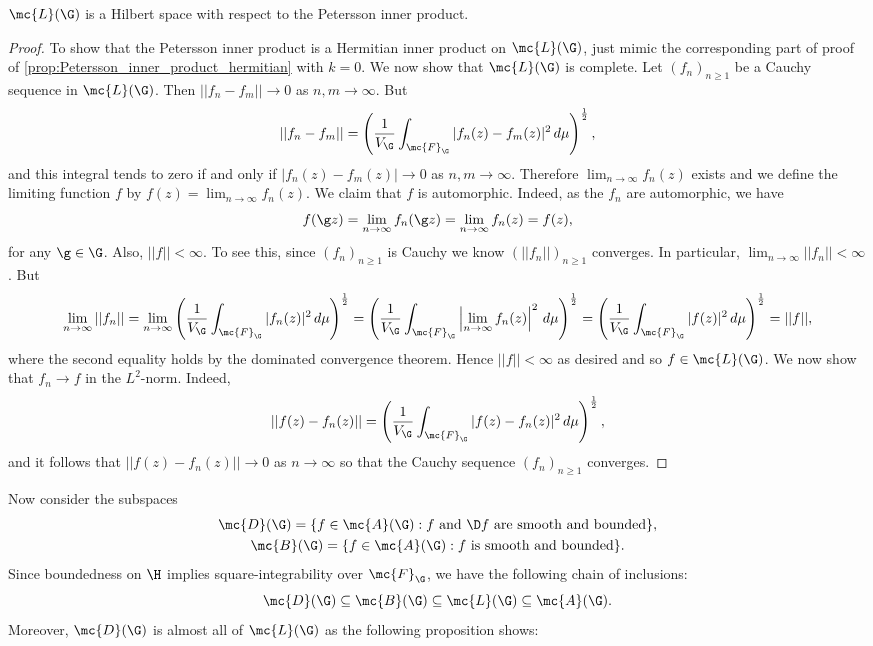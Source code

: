     \begin{theorem}
      $\mc{L}(\G)$ is a Hilbert space with respect to the Petersson inner product.
    \end{theorem}
    \begin{proof}
      To show that the Petersson inner product is a Hermitian inner product on $\mc{L}(\G)$, just mimic the corresponding part of proof of \cref{prop:Petersson_inner_product_hermitian} with $k = 0$. We now show that $\mc{L}(\G)$ is complete. Let $(f_{n})_{n \ge 1}$ be a Cauchy sequence in $\mc{L}(\G)$. Then $||f_{n}-f_{m}|| \to 0$ as $n,m \to \infty$. But
      \[
        ||f_{n}-f_{m}|| = \left(\frac{1}{V_{\G}}\int_{\mc{F}_{\G}}|f_{n}(z)-f_{m}(z)|^{2}\,d\mu\right)^{\frac{1}{2}},
      \]
      and this integral tends to zero if and only if $|f_{n}(z)-f_{m}(z)| \to 0$ as $n,m \to \infty$. Therefore $\lim_{n \to \infty}f_{n}(z)$ exists and we define the limiting function $f$ by $f(z) = \lim_{n \to \infty}f_{n}(z)$. We claim that $f$ is automorphic. Indeed, as the $f_{n}$ are automorphic, we have
      \[
        f(\g z) = \lim_{n \to \infty}f_{n}(\g z) = \lim_{n \to \infty}f_{n}(z) = f(z),
      \]
      for any $\g \in \G$. Also, $||f|| < \infty$. To see this, since $(f_{n})_{n \ge 1}$ is Cauchy we know $(||f_{n}||)_{n \ge 1}$ converges. In particular, $\lim_{n \to \infty}||f_{n}|| < \infty$. But
      \[
        \lim_{n \to \infty}||f_{n}|| = \lim_{n \to \infty}\left(\frac{1}{V_{\G}}\int_{\mc{F}_{\G}}|f_{n}(z)|^{2}\,d\mu\right)^{\frac{1}{2}} = \left(\frac{1}{V_{\G}}\int_{\mc{F}_{\G}}\left|\lim_{n \to \infty}f_{n}(z)\right|^{2}\,d\mu\right)^{\frac{1}{2}} = \left(\frac{1}{V_{\G}}\int_{\mc{F}_{\G}}|f(z)|^{2}\,d\mu\right)^{\frac{1}{2}} = ||f||,
      \]
      where the second equality holds by the dominated convergence theorem. Hence $||f|| < \infty$ as desired and so $f \in \mc{L}(\G)$. We now show that $f_{n} \to f$ in the $L^{2}$-norm. Indeed,
      \[
        ||f(z)-f_{n}(z)|| = \left(\frac{1}{V_{\G}}\int_{\mc{F}_{\G}}|f(z)-f_{n}(z)|^{2}\,d\mu\right)^{\frac{1}{2}},
      \]
      and it follows that $||f(z)-f_{n}(z)|| \to 0$ as $n \to \infty$ so that the Cauchy sequence $(f_{n})_{n \ge 1}$ converges.
    \end{proof}

    Now consider the subspaces
    \begin{gather*}
      \mc{D}(\G) = \{f \in \mc{A}(\G):\text{$f$ and $\D f$ are smooth and bounded}\}, \\
      \mc{B}(\G) = \{f \in \mc{A}(\G):\text{$f$ is smooth and bounded}\}.
    \end{gather*}
    Since boundedness on $\H$ implies square-integrability over $\mc{F}_{\G}$, we have the following chain of inclusions:
    \[
      \mc{D}(\G) \subseteq \mc{B}(\G) \subseteq \mc{L}(\G) \subseteq \mc{A}(\G).
    \]
    Moreover, $\mc{D}(\G)$ is almost all of $\mc{L}(\G)$ as the following proposition shows:

